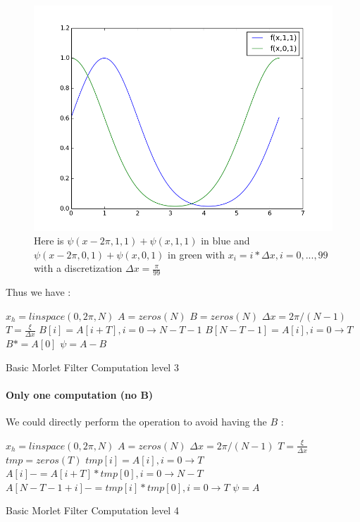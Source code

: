 \documentclass[a4paper]{report}
\begin{document}
\begin{figure}[H]
\begin{center}
\includegraphics[scale=0.31]{f_g.png}\caption{Here is $\psi(x-2\pi,1,1)+\psi(x,1,1)$ in blue and $\psi(x-2\pi,0,1)+\psi(x,0,1)$ in green with $x_i=i*\Delta x,i=0,...,99$ with a discretization $\Delta x=\frac{\pi}{99}$}
\end{center}
\end{figure}
Thus we have :

\begin{algorithm}[H]
 \KwData{$\xi$, $\sigma$, $\epsilon$}
 \KwResult{$\psi$}
 $x_h=linspace(0,2\pi,N)$\;
 $A=zeros(N)$\;
 $B=zeros(N)$\;
 $\Delta x=2\pi/(N-1)$\;
 $T=\frac{\xi}{\Delta x}$\;
  {
  }
  $B[i]=A[i+T],i=0 \rightarrow N-T-1$\;
  $ B[N-T-1]=A[i], i=0 \rightarrow T$\;
  $B*=A[0]$\;
  $\psi= A-B$\;
 \caption{Basic Morlet Filter Computation level 3}
\end{algorithm}


\paragraph{Only one computation (no B)}
We could directly perform the operation to avoid having the $B$ :


\begin{algorithm}[H]
 \KwData{$\xi$, $\sigma$, $\epsilon$}
 \KwResult{$\psi$}
 $x_h=linspace(0,2\pi,N)$\;
 $A=zeros(N)$\;
 $\Delta x=2\pi/(N-1)$\;
 $T=\frac{\xi}{\Delta x}$\;
  $tmp=zeros(T)$\;
  {
  }
  $tmp[i]=A[i],i=0 \rightarrow T$\;
  $A[i]-=A[i+T]*tmp[0], i=0 \rightarrow N-T$\;
  $A[N-T-1+i]-=tmp[i]*tmp[0], i=0 \rightarrow T$\;
  $\psi=A$
 \caption{Basic Morlet Filter Computation level 4}
\end{algorithm}
\end{document}
